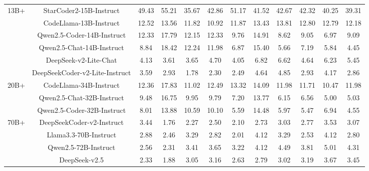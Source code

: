 \documentclass[11pt, a4paper, logo, copyright, nonumbering, amsart]{map}
\begin{document}
\begin{CJK*}{UTF8}{gbsn}
\begin{table*}[h!]
\begin{adjustbox}{width=\textwidth}
\begin{tabular}{c|c|cccccccccc}
    \midrule
    \multirow{6}{*}{13B+} 
    & StarCoder2-15B-Instruct & 49.43 & 55.21 & 35.67 & 42.86 & 51.17 & 41.52 & 42.67 & 42.32 & 40.25 & 39.31 \\
    & CodeLlama-13B-Instruct & 12.52 & 13.56 & 11.82 & 10.92 & 11.87 & 13.43 & 13.81 & 12.80 & 12.79 & 12.18 \\
    & Qwen2.5-Coder-14B-Instruct & 12.33 & 17.79 & 12.15 & 12.33 & 9.76 & 14.91 & 8.62 & 9.05 & 6.97 & 9.09 \\
    & Qwen2.5-Chat-14B-Instruct & 8.84 & 18.42 & 12.24 & 11.98 & 6.87 & 15.40 & 5.66 & 7.19 & 5.84 & 4.45 \\
    & DeepSeek-v2-Lite-Chat & 4.13 & 3.61 & 3.65 & 4.70 & 4.05 & 6.82 & 6.62 & 4.64 & 6.23 & 5.45 \\
    & DeepSeekCoder-v2-Lite-Instruct & 3.59 & 2.93 & 1.78 & 2.30 & 2.49 & 4.64 & 4.85 & 2.93 & 4.17 & 2.86 \\
    
    \midrule
    \multirow{3}{*}{20B+} 
    & CodeLlama-34B-Instruct & 12.36 & 17.83 & 11.02 & 12.49 & 13.32 & 14.09 & 11.98 & 11.71 & 10.47 & 11.98 \\
    & Qwen2.5-Chat-32B-Instruct & 9.48 & 16.75 & 9.95 & 9.79 & 7.20 & 13.77 & 6.15 & 6.56 & 5.00 & 5.03 \\
    & Qwen2.5-Coder-32B-Instruct & 8.01 & 13.88 & 10.59 & 10.10 & 5.59 & 14.48 & 5.97 & 5.47 & 6.94 & 4.55 \\
    
    \midrule
    \multirow{4}{*}{70B+} 
    & DeepSeekCoder-v2-Instruct & 3.44 & 1.76 & 2.27 & 2.50 & 2.10 & 2.73 & 3.03 & 2.77 & 3.53 & 3.07 \\
    & Llama3.3-70B-Instruct & 2.88 & 2.46 & 3.29 & 2.82 & 2.01 & 4.12 & 3.29 & 2.53 & 4.12 & 2.80 \\
    & Qwen2.5-72B-Instruct & 2.56 & 2.31 & 3.41 & 3.65 & 3.22 & 4.12 & 4.49 & 3.81 & 5.01 & 4.31 \\
    & DeepSeek-v2.5 & 2.33 & 1.88 & 3.05 & 3.16 & 2.63 & 2.79 & 3.02 & 3.19 & 3.67 & 3.45 \\
    

\end{tabular}
\end{adjustbox}
\end{table*}
\end{CJK*}
\end{document}
